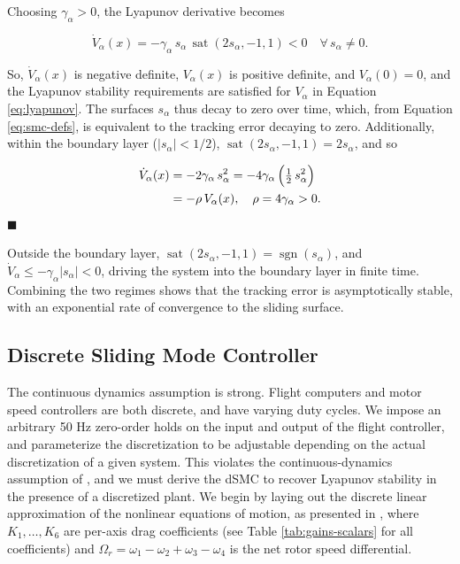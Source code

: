 \documentclass[conf]{new-aiaa}
\DeclareMathOperator{\sat}{sat}
\DeclareMathOperator{\sgn}{sgn}
\begin{document}
Choosing $\gamma_\alpha > 0$, the Lyapunov derivative becomes

\small
\begin{equation}
\label{eq:lyap-negdef}
\dot V_\alpha(x)
= -\gamma_\alpha\, s_\alpha\,
\sat(2s_\alpha,-1,1)
< 0
\quad \forall\, s_\alpha \neq 0.
\end{equation}
\normalsize

So, $\dot V_\alpha(x)$ is negative definite, $V_\alpha(x)$ is positive definite, and $V_\alpha(0)=0$, and the Lyapunov stability requirements are satisfied for $V_\alpha$ in Equation \ref{eq:lyapunov}. The surfaces $s_\alpha$ thus decay to zero over time, which, from Equation \ref{eq:smc-defs}, is equivalent to the tracking error decaying to zero. Additionally, within the boundary layer ($|s_\alpha| < 1/2$), $\sat(2s_\alpha,-1,1) = 2s_\alpha$, and so

\small
\begin{align}
\dot V_\alpha(x) &= -2\gamma_\alpha\, s_\alpha^2
= -4\gamma_\alpha\,\Big(\tfrac{1}{2}\, s_\alpha^2\Big) \notag \\
&= -\rho\, V_\alpha(x), \quad \rho = 4\gamma_\alpha > 0.
\label{eq:lyap_exp_stab}
\end{align}
\normalsize
\hfill$\blacksquare$

Outside the boundary layer, $\sat(2s_\alpha,-1,1) = \sgn(s_\alpha)$, and $\dot V_\alpha \leq -\gamma_\alpha |s_\alpha| < 0$, driving the system into the boundary layer in finite time. Combining the two regimes shows that the tracking error is asymptotically stable, with an exponential rate of convergence to the sliding surface.

\subsection{Discrete Sliding Mode Controller}
The continuous dynamics assumption is strong. Flight computers and motor speed controllers are both discrete, and have varying duty cycles. We impose an arbitrary 50 Hz zero-order holds on the input and output of the flight controller, and parameterize the discretization to be adjustable depending on the actual discretization of a given system. This violates the continuous-dynamics assumption of \cite{refs:Tahir2020}, and we must derive the dSMC to recover Lyapunov stability in the presence of a discretized plant. We begin by laying out the discrete linear approximation of the nonlinear equations of motion, as presented in \cite{refs:Xiong2016}, where $K_1, \dots, K_6$ are per-axis drag coefficients (see Table \ref{tab:gains-scalars} for all coefficients) and $\Omega_r = \omega_1 - \omega_2 + \omega_3 - \omega_4$ is the net rotor speed differential.
\end{document}
